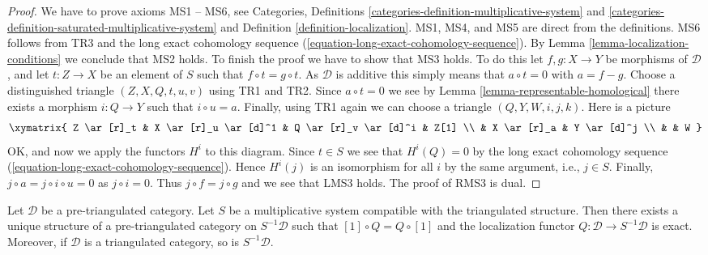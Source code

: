 \begin{proof}
We have to prove axioms MS1 -- MS6, see
Categories, Definitions \ref{categories-definition-multiplicative-system} and
\ref{categories-definition-saturated-multiplicative-system}
and
Definition \ref{definition-localization}.
MS1, MS4, and MS5 are direct from the definitions.
MS6 follows from TR3 and the long exact cohomology sequence
(\ref{equation-long-exact-cohomology-sequence}).
By
Lemma \ref{lemma-localization-conditions}
we conclude that MS2 holds. To finish the proof we have to show that
MS3 holds. To do this let $f, g : X \to Y$ be morphisms of $\mathcal{D}$,
and let $t : Z \to X$ be an element of $S$ such that $f \circ t = g \circ t$.
As $\mathcal{D}$ is additive this simply means that $a \circ t = 0$ with
$a = f - g$. Choose a distinguished triangle $(Z, X, Q, t, u, v)$ using
TR1 and TR2. Since $a \circ t = 0$ we see by
Lemma \ref{lemma-representable-homological}
there exists a morphism $i : Q \to Y$ such that $i \circ u = a$.
Finally, using TR1 again we can choose a triangle
$(Q, Y, W, i, j, k)$. Here is a picture
$$
\xymatrix{
Z \ar[r]_t & X \ar[r]_u \ar[d]^1 & Q \ar[r]_v \ar[d]^i & Z[1] \\
& X \ar[r]_a & Y \ar[d]^j \\
& & W
}
$$
OK, and now we apply the functors $H^i$ to this diagram.
Since $t \in S$ we see that $H^i(Q) = 0$ by the long exact cohomology
sequence (\ref{equation-long-exact-cohomology-sequence}).
Hence $H^i(j)$ is an isomorphism for all $i$ by the same argument,
i.e., $j \in S$. Finally, $j \circ a = j \circ i \circ u = 0$ as
$j \circ i = 0$. Thus $j \circ f = j \circ g$ and we see that LMS3 holds.
The proof of RMS3 is dual.
\end{proof}

\begin{proposition}
\label{proposition-construct-localization}
Let $\mathcal{D}$ be a pre-triangulated category. Let $S$ be a multiplicative
system compatible with the triangulated structure.
Then there exists a unique structure of a pre-triangulated category on
$S^{-1}\mathcal{D}$ such that $[1] \circ Q = Q \circ [1]$ and
the localization functor $Q : \mathcal{D} \to S^{-1}\mathcal{D}$ is exact.
Moreover, if $\mathcal{D}$ is a triangulated category, so is
$S^{-1}\mathcal{D}$.
\end{proposition}


